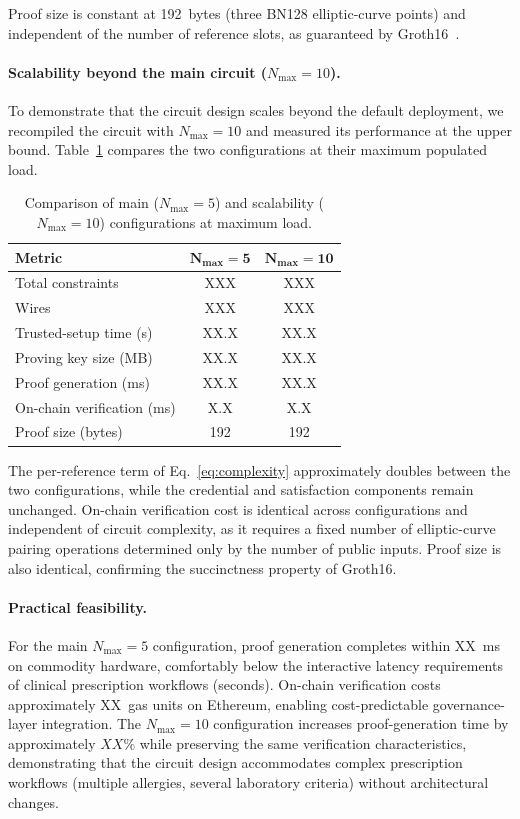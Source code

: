 \documentclass[journal]{IEEEtran}
\begin{document}
Proof size is constant at 192~bytes (three BN128 elliptic-curve
points) and independent of the number of reference slots, as
guaranteed by Groth16~\cite{groth2016}.

\paragraph{Scalability beyond the main circuit ($N_{\max} = 10$).}
To demonstrate that the circuit design scales beyond the default
deployment, we recompiled the circuit with $N_{\max} = 10$ and
measured its performance at the upper bound. Table~\ref{tab:perf-scale}
compares the two configurations at their maximum populated load.

\begin{table}[h]
\centering
\caption{Comparison of main ($N_{\max} = 5$) and scalability
($N_{\max} = 10$) configurations at maximum load.}
\label{tab:perf-scale}
\footnotesize
\renewcommand{\arraystretch}{1.1}
\begin{tabular}{l c c}
\toprule
\textbf{Metric} & $\mathbf{N_{\max} = 5}$ & $\mathbf{N_{\max} = 10}$ \\
\midrule
Total constraints        & XXX  & XXX  \\
Wires                    & XXX  & XXX  \\
Trusted-setup time (s)   & XX.X & XX.X \\
Proving key size (MB)    & XX.X & XX.X \\
Proof generation (ms)    & XX.X & XX.X \\
On-chain verification (ms) & X.X & X.X \\
Proof size (bytes)       & 192  & 192  \\
\bottomrule
\end{tabular}
\end{table}

The per-reference term of Eq.~\ref{eq:complexity} approximately
doubles between the two configurations, while the credential and
satisfaction components remain unchanged. On-chain verification cost
is identical across configurations and independent of circuit
complexity, as it requires a fixed number of elliptic-curve pairing
operations determined only by the number of public inputs. Proof
size is also identical, confirming the succinctness property of
Groth16.

\paragraph{Practical feasibility.}
For the main $N_{\max} = 5$ configuration, proof generation completes
within XX~ms on commodity hardware, comfortably below the
interactive latency requirements of clinical prescription workflows
(seconds). On-chain verification costs approximately XX~gas units on
Ethereum, enabling cost-predictable governance-layer integration.
The $N_{\max} = 10$ configuration increases proof-generation time by
approximately $\mathit{XX}\%$ while preserving the same verification
characteristics, demonstrating that the circuit design accommodates
complex prescription workflows (multiple allergies, several
laboratory criteria) without architectural changes.
\end{document}
